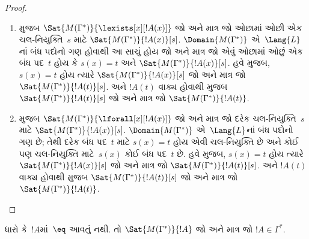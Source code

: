\begin{proof}
\begin{enumerate}
\item %
   મુજબ
    $\Sat{M(\Gamma^*)}{\lexists[x][!A(x)]}$ જો અને માત્ર જો ઓછામાં ઓછી
    એક ચલ-નિયુક્તિ~$s$ માટે $\Sat{M(\Gamma^*)}{!A(x)}[s]$.
    $\Domain{M(\Gamma^*)}$ એ~$\Lang{L}$નાં બંધ પદોનો ગણ હોવાથી આ સાચું
    હોય જો અને માત્ર જો એવું ઓછામાં ઓછું એક બંધ પદ~$t$ હોય કે
    $s(x)=t$ અને $\Sat{M(\Gamma^*)}{!A(x)}[s]$. હવે
     મુજબ, $s(x)=t$ હોય ત્યારે
    $\Sat{M(\Gamma^*)}{!A(x)}[s]$ જો અને માત્ર જો
    $\Sat{M(\Gamma^*)}{!A(t)}[s]$. અને $!A(t)$ વાક્ય હોવાથી
     મુજબ
    $\Sat{M(\Gamma^*)}{!A(t)}[s]$ જો અને માત્ર જો
    $\Sat{M(\Gamma^*)}{!A(t)}$.
\item %
   મુજબ
    $\Sat{M(\Gamma^*)}{\lforall[x][!A(x)]}$ જો અને માત્ર જો દરેક
    ચલ-નિયુક્તિ~$s$ માટે $\Sat{M(\Gamma^*)}{!A(x)}[s]$.
    $\Domain{M(\Gamma^*)}$ એ~$\Lang{L}$નાં બંધ પદોનો ગણ છે; તેથી દરેક
    બંધ પદ~$t$ માટે $s(x)=t$ હોય એવી ચલ-નિયુક્તિ છે અને કોઈ પણ
    ચલ-નિયુક્તિ માટે~$s(x)$ કોઈ બંધ પદ~$t$ છે. હવે
     મુજબ, $s(x)=t$ હોય ત્યારે
    $\Sat{M(\Gamma^*)}{!A(x)}[s]$ જો અને માત્ર જો
    $\Sat{M(\Gamma^*)}{!A(t)}[s]$. અને $!A(t)$ વાક્ય હોવાથી
     મુજબ
    $\Sat{M(\Gamma^*)}{!A(t)}[s]$ જો અને માત્ર જો
    $\Sat{M(\Gamma^*)}{!A(t)}$.
\end{enumerate}
\end{proof}




\begin{lem}[સત્યતા સહાયક પ્રમેય]
 ધારો કે~$!A$માં~$\eq$ આવતું નથી. તો
$\Sat{M(\Gamma^*)}{!A}$ જો અને માત્ર
જો $!A \in \Gamma^*$.
\end{lem}

